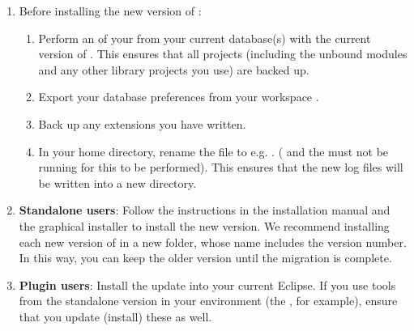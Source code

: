 \begin{enumerate}
\item Before installing the new version of \app{}:
\begin{enumerate}
\item Perform an  of your \gdprojects{} from your current database(s) with the current version of \app{} . This ensures that all projects (including the unbound modules and any other library projects you use) are backed up.
\item Export your database preferences from your workspace .
\item Back up any extensions you have written.
\item In your home directory, rename the  file to e.g. . (\app{} and the \gdagent{} must not be running for this to be performed). This ensures that the new log files will be written into a new  directory. 
\end{enumerate}
\item \textbf{Standalone users}: Follow the instructions in the installation manual and the graphical installer to install the new version. We recommend installing each new version of \app{} in a new folder, whose name includes the version number. In this way, you can keep the older version until the migration is complete. 
\item \textbf{Plugin users}: Install the update into your current Eclipse. If you use tools from the standalone version in your environment (the \gdagent{}, for example), ensure that you update (install) these as well. 
\end{enumerate}
